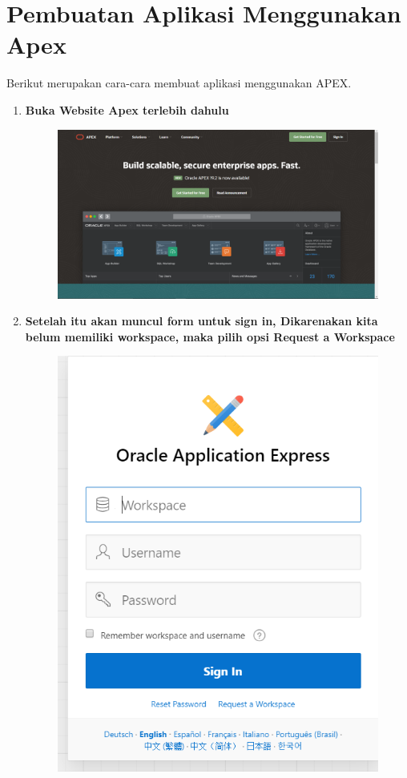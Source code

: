 \chapter*{Pembuatan Aplikasi Menggunakan Apex}
\par
Berikut merupakan cara-cara membuat aplikasi menggunakan APEX.
\begin{enumerate}
\item \textbf{Buka Website Apex terlebih dahulu}
\begin{figure}[H]
    \centering
    \includegraphics[scale=0.3]{figures/1.png}
    \label{1}
\end{figure}

\item \textbf{Setelah itu akan muncul form untuk sign in, Dikarenakan kita belum memiliki workspace, maka pilih opsi \textbf{Request a Workspace}}
\begin{figure}[H]
    \centering
    \includegraphics[scale=0.3]{figures/2.png}
    \label{2}
\end{figure}


\end{enumerate}
